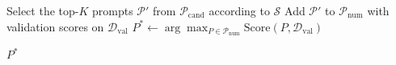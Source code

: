 \documentclass[12pt]{article}
\begin{document}
\begin{algorithm}
\begin{algorithmic}[1]


    \State Select the top-$K$ prompts $\mathcal{P}'$ from $\mathcal{P}_{\mathrm{cand}}$ according to $\mathcal{S}$
    \State Add $\mathcal{P}'$ to $\mathcal{P}_{\text{num}}$ with validation scores on $\mathcal{D}_{\mathrm{val}}$
\EndFor
\State $P^{*} \gets \arg\max_{P \in \mathcal{P}_{\text{num}}} \mathrm{Score}(P, \mathcal{D}_{\text{val}})$

\State \Return $P^{*}$
\end{algorithmic}
\end{algorithm}
\end{document}
